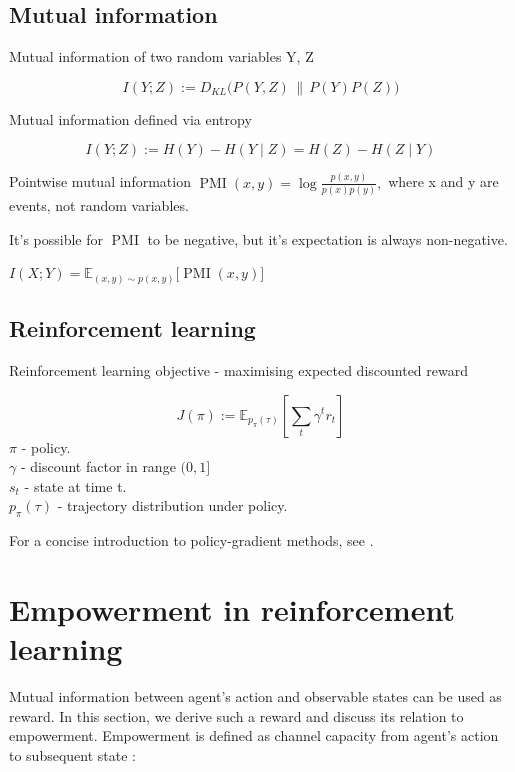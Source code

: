 \subsection*{Mutual information}


Mutual information of two random variables Y, Z

\begin{equation}
	I(Y;Z) := D_{KL}\bigl(P(Y,Z)\,\|\,P(Y)P(Z)\bigr)
	\label{eq:mutual-information-kl}
\end{equation}

Mutual information defined via entropy

\begin{equation}
	I(Y;Z) := H(Y)-H(Y\mid Z) = H(Z)-H(Z\mid Y)
	\label{eq:mutual-information-entropy}
\end{equation}


Pointwise mutual information $ \operatorname{PMI}(x,y)
= \log \frac{p(x,y)}{p(x)p(y)},$ where x and y are events, not random variables.

It's possible for $\operatorname{PMI}$ to be negative, but it's expectation is always non-negative.

$I(X;Y)  =  {\mathbb{E}}_{(x,y) \sim p(x,y)} \lbrack \operatorname{PMI}(x,y) \rbrack$

\subsection{Reinforcement learning}

Reinforcement learning objective - maximising expected discounted reward

\begin{equation}
J(\pi) := \mathbb{E}_{p_π(τ)}\left[\sum_t \gamma^t r_t\right]
\label{eq:rl-objective}
\end{equation}
$\pi$ - policy.\\ 
$\gamma$ - discount factor in range $(0, 1]$ \\
$s_{t}$ - state at time t.\\
$p_π(τ)$ - trajectory distribution under policy. 

For a concise introduction to policy-gradient methods, see \cite{peters2010policy}.

\section{Empowerment in reinforcement learning}\label{empowerment-in-reinforcement-learning}

Mutual information between agent's action and observable states can be used as reward. In this section, we derive such a reward and discuss its relation to empowerment. Empowerment is defined as channel capacity from agent's action to subsequent state \cite{klyubin2005empowerment}:

